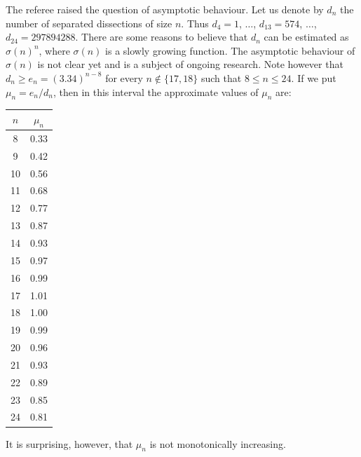 \documentclass[12pt,amstags,fleqn]{article}
\theoremstyle{plain}
\theoremstyle{definition}
\begin{document}
The referee raised the question of asymptotic behaviour. Let us denote
by $d_n$ the number of separated dissections of size $n$.  Thus $d_4 = 1$,
$\dots$, $d_{13} = 574$, $\dots$, $d_{24} = 297894288$.  There are some
reasons to believe that $d_n$ can be estimated as $\sigma(n)^n$,
where $\sigma(n)$ is a slowly growing function. The asymptotic
behaviour of $\sigma(n)$ is not clear yet and is a subject of ongoing
research. Note however that $d_n \ge e_n = (3.34)^{n-8}$ for every
$n\notin \{17,18\}$ such that $8 \le n \le 24$.  If we put $\mu_n =
e_n/d_n$, then in this interval the approximate values of $\mu_n$
are:
\begin{center}
\begin{tabular}{|c|c|}
\hline $n$ & $\mu_n$ \\
\hline
\hline 8 & 0.33 \\
\hline 9 & 0.42 \\
\hline 10 & 0.56 \\
\hline 11 & 0.68 \\
\hline 12 & 0.77 \\
\hline 13 & 0.87 \\
\hline 14 & 0.93 \\
\hline 15 & 0.97 \\
\hline 16 & 0.99 \\
\hline 17 & 1.01 \\
\hline 18 & 1.00 \\
\hline 19 & 0.99 \\
\hline 20 & 0.96 \\
\hline 21 & 0.93 \\
\hline 22 & 0.89 \\
\hline 23 & 0.85 \\
\hline 24 & 0.81 \\
\hline
\end{tabular}
\end{center}
It is surprising, however, that $\mu_n$ is not monotonically increasing.
%
\end{document}
